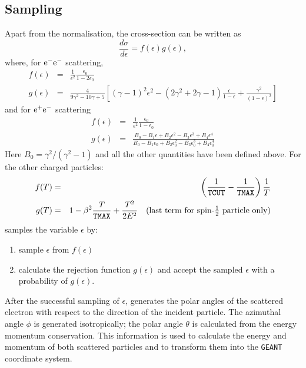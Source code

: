 \subsection{Sampling} 
Apart from the normalisation, the cross-section can be written as
\[
\frac{d\sigma}{d\epsilon}=f(\epsilon) g(\epsilon),
\]
where, for $\mathrm{e}^-\mathrm{e}^-$ scattering,
\begin{eqnarray*}
f(\epsilon)&=&\frac{1}{\epsilon^2} \frac{\epsilon_0 }{1- 2\epsilon_0} \\
g(\epsilon)&=&\frac{4}{9\gamma^2 - 10 \gamma + 5}\left[(\gamma -1)^2
\epsilon^2 - (2 \gamma^2 +2\gamma -1) \frac{\epsilon} {1- \epsilon }+
\frac{\gamma^2}{(1- \epsilon )^2 }\right]
\end{eqnarray*}
and for $\mathrm{e}^+\mathrm{e}^-$ scattering
\begin{eqnarray*}
  f(\epsilon)&=&\frac{1}{\epsilon^2} \frac{\epsilon_0}{1- \epsilon_0 } \\
  g(\epsilon)&=&\frac{B_0 -B_1 \epsilon +B_2 \epsilon^2
     -B_3 \epsilon^3 +B_4 \epsilon ^4}{B_ 0-B_1\epsilon_0
+B_2\epsilon^2_0
    -B_3 \epsilon^3_0 +B_4 \epsilon^4_0 }
\end{eqnarray*}
Here $ B_0=\gamma^2/(\gamma^2-1)$ and
all the other quantities have been defined above.
For the other charged particles:
\begin{eqnarray*}
f(T) &=& \left(\frac{1}{\mbox{\tt TCUT}} -\frac{1}{\mbox{\tt TMAX}}\right)  
\frac{1}{T} \\
g(T) &=& 1 - \beta^2\frac{T}{\mbox{\tt TMAX}} +\frac{T^2}{2E^2}
\mbox{\quad(last term for spin-$\frac{1}{2}$ particle only)}
\end{eqnarray*}
 samples the variable $\epsilon$ by:
\begin{enumerate}
\item sample $\epsilon$ from $f(\epsilon)$
\item calculate the rejection function $g(\epsilon)$ and accept the
sampled $\epsilon$ with a probability of $g(\epsilon)$.
\end{enumerate}
 
After the successful sampling of $\epsilon$,  generates the polar
angles of the scattered electron with respect to the direction of the
incident particle. The azimuthal angle $\phi$ is generated isotropically;
the polar angle
$\theta$ is calculated from the energy momentum conservation.
This information
is used to calculate the energy and momentum of both scattered
particles and to transform them into the {\tt GEANT} coordinate system.
